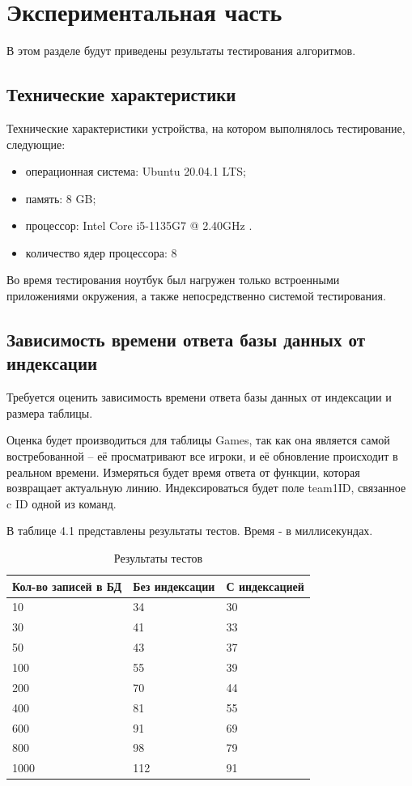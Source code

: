 \chapter{Экспериментальная часть}
В этом разделе будут приведены результаты тестирования алгоритмов.

\section{Технические характеристики}
Технические характеристики устройства, на котором выполнялось тестирование, следующие:
\begin{itemize}
	\item операционная система: Ubuntu 20.04.1 LTS;
	\item память: 8 GB;
	\item процессор: Intel Core i5-1135G7 @ 2.40GHz \cite{intel}.
	\item количество ядер процессора: 8
\end{itemize}

Во время тестирования ноутбук был нагружен только встроенными приложениями окружения, а также непосредственно системой тестирования.

\section{Зависимость времени ответа базы данных от индексации}
Требуется оценить зависимость времени ответа базы данных от индексации и размера таблицы.

Оценка будет производиться для таблицы Games, так как она является самой востребованной -- её просматривают все игроки, и её обновление происходит в реальном времени. 
Измеряться будет время ответа от функции, которая возвращает актуальную линию. 
Индексироваться будет поле team1ID, связанное c ID одной из команд.

В таблице 4.1 представлены результаты тестов. Время - в миллисекундах.
\FloatBarrier
\begin{table}[h]
	\caption{Результаты тестов}
	\centering
	\begin{tabular}{ | l | l | l |}
		\hline
		Кол-во записей в БД & Без индексации & С индексацией \\ 
		\hline
		10 & 34 & 30 \\
		30 & 41 & 33 \\
		50 & 43 & 37 \\
		100 & 55 & 39 \\
		200 & 70 & 44 \\
		400 & 81 & 55 \\
		600 & 91 & 69 \\
		800 & 98 & 79 \\
		1000 & 112 & 91 \\
		\hline
	\end{tabular}
\end{table}
\FloatBarrier


